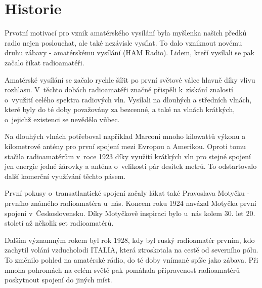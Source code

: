 \section{Historie}
\label{radioamateri_hist}
Prvotní motivací pro vznik amatérského vysílání %
byla myšlenka našich předků radio %
nejen poslouchat, ale také nezávisle vysílat.
To dalo vzniknout novému druhu zábavy - amatérskému vysílání (HAM Radio). Lidem, kteří vysílali se pak začalo říkat 
radioamatéři.

Amatérské vysílání se začalo rychle šířit po první světové válce hlavně díky vlivu
rozhlasu. %
V~těchto dobách radioamatéři značně
přispěli k~získání znalostí o~využití celého spektra radiových vln. Vysílali na dlouhých a středních vlnách, které byly do té doby
považovány za bezcenné, a také na vlnách krátkých, o~jejichž existenci se nevědělo vůbec.

Na dlouhých vlnách potřeboval například Marconi mnoho kilowattů výkonu a kilometrové antény pro první spojení
mezi Evropou a Amerikou. Oproti tomu stačila radioamatérům v~roce 1923 díky využití krátkých vln
pro stejné spojení jen energie jedné žárovky a anténa o~velikosti pár desítek
metrů. To odstartovalo další komerční
využívání těchto pásem.

První pokusy o~transatlantické spojení začaly lákat také Pravoslava Motyčku - prvního známého radioamatéra u~nás.
Koncem roku 1924 navázal Motyčka první spojení v~Československu. 
Díky Motyčkově inspiraci bylo u~nás kolem 30. let 20. století až několik set radioamatérů.

Dalším významným rokem byl rok 1928, kdy byl ruský radioamatér prvním, kdo zachytil volání vzducholodi ITALIA,
která ztroskotala na cestě od severního pólu. To změnilo pohled na amatérské
rádio, do té doby vnímané spíše jako zábava. Při mnoha pohromách na celém světě
pak pomáhala připravenost radioamatérů poskytnout spojení do
jiných míst.

